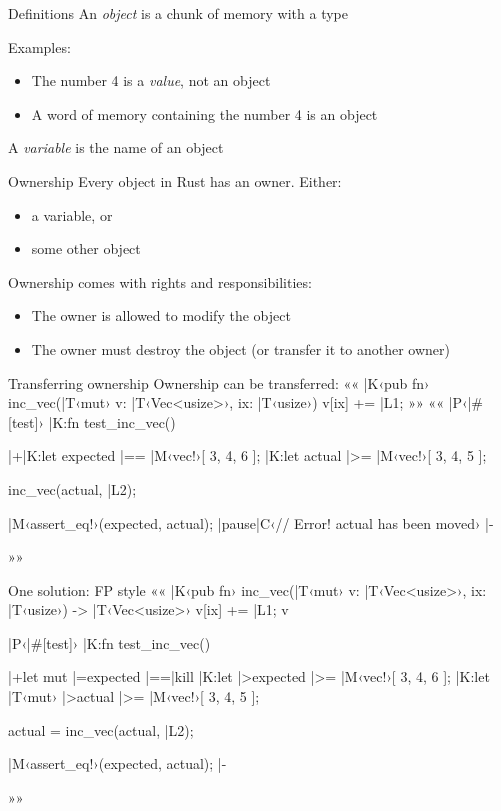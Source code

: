 \documentclass{beamer}
\begin{document}
\begin{frame}
\thispagestyle{empty}\centering
{}
\end{frame}

\begin{frame}{Definitions}{}
  An \emph{object} is a chunk of memory with a type
  \par
  Examples:
  \begin{itemize}
    \item The number 4 is a \emph{value}, not an object
    \item A word of memory containing the number 4 is an object
  \end{itemize}
  A \emph{variable} is the name of an object
\end{frame}

\begin{frame}{Ownership}{}
  Every object in Rust has an owner. Either:
  \begin{itemize}
    \item a variable, or
    \item some other object
  \end{itemize}
  \par\pause\medskip
  Ownership comes with rights and responsibilities:
  \begin{itemize}
    \item The owner is allowed to modify the object
    \item The owner must destroy the object (or transfer it to another owner)
  \end{itemize}
\end{frame}

\begin{frame}[fragile]{Transferring ownership}{}
  Ownership can be transferred:
  ««
  |K‹pub fn› inc_vec(|T‹mut› v: |T‹Vec<usize>›, ix: |T‹usize›) {
    	v[ix] += |L1;
  }
  »»
  \pause
  ««
  |P‹|#[test]›
  |K:fn test_inc_vec() {
  	|+|K:let expected |== |M‹vec!›[ 3, 4, 6 ];
    |K:let actual   |>= |M‹vec!›[ 3, 4, 5 ];

    inc_vec(actual, |L2);

    |M‹assert_eq!›(expected, actual); |pause|C‹// Error! actual has been moved› |-
  }
  »»
\end{frame}

\begin{frame}[fragile]{One solution: FP style}
  ««
  |K‹pub fn› inc_vec(|T‹mut› v: |T‹Vec<usize>›, ix: |T‹usize›) -> |T‹Vec<usize>› {
    	v[ix] += |L1;
    	v
  }

  |P‹|#[test]›
  |K:fn test_inc_vec() {
  	|+let mut |=expected |==|kill%
    |K:let |>expected     |>= |M‹vec!›[ 3, 4, 6 ];
    |K:let |T‹mut› |>actual |>= |M‹vec!›[ 3, 4, 5 ];

    actual = inc_vec(actual, |L2);

    |M‹assert_eq!›(expected, actual); |-
  }
  »»
\end{frame}
\end{document}
